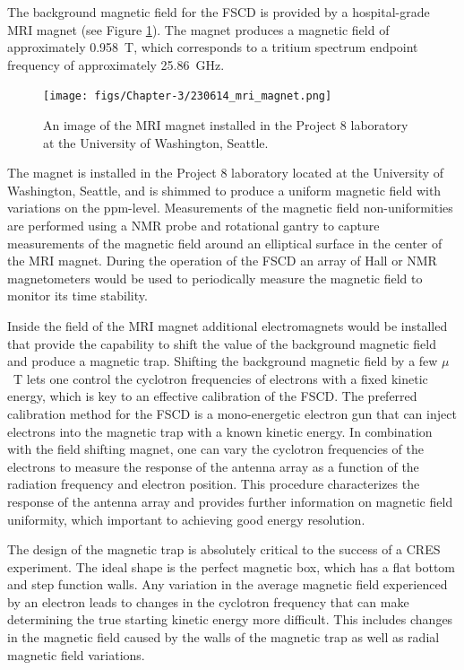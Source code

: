 The background magnetic field for the FSCD is provided by a hospital-grade MRI magnet (see Figure \ref{fig:chap3-mri-magnet}). The magnet produces a magnetic field of approximately 0.958~T, which corresponds to a tritium spectrum endpoint frequency of approximately 25.86~GHz. 
\begin{figure}[htbp]
    \centering
    \texttt{[image: figs/Chapter-3/230614\_mri\_magnet.png]}
    \caption{\label{fig:chap3-mri-magnet} An image of the MRI magnet installed in the Project 8 laboratory at the University of Washington, Seattle.}
\end{figure}
The magnet is installed in the Project 8 laboratory located at the University of Washington, Seattle, and is shimmed to produce a uniform magnetic field with variations on the ppm-level. Measurements of the magnetic field non-uniformities are performed using a NMR probe and rotational gantry to capture measurements of the magnetic field around an elliptical surface in the center of the MRI magnet. During the operation of the FSCD an array of Hall or NMR magnetometers would be used to periodically measure the magnetic field to monitor its time stability.

Inside the field of the MRI magnet additional electromagnets would be installed that provide the capability to shift the value of the background magnetic field and produce a magnetic trap. Shifting the background magnetic field by a few $\mu$~T lets one control the cyclotron frequencies of electrons with a fixed kinetic energy, which is key to an effective calibration of the FSCD. The preferred calibration method for the FSCD is a mono-energetic electron gun that can inject electrons into the magnetic trap with a known kinetic energy. In combination with the field shifting magnet, one can vary the cyclotron frequencies of the electrons to measure the response of the antenna array as a function of the radiation frequency and electron position. This procedure characterizes the response of the antenna array and provides further information on magnetic field uniformity, which important to achieving good energy resolution.

The design of the magnetic trap is absolutely critical to the success of a CRES experiment. The ideal shape is the perfect magnetic box, which has a flat bottom and step function walls. Any variation in the average magnetic field experienced by an electron leads to changes in the cyclotron frequency that can make determining the true starting kinetic energy more difficult. This includes changes in the magnetic field caused by the walls of the magnetic trap as well as radial magnetic field variations. 

